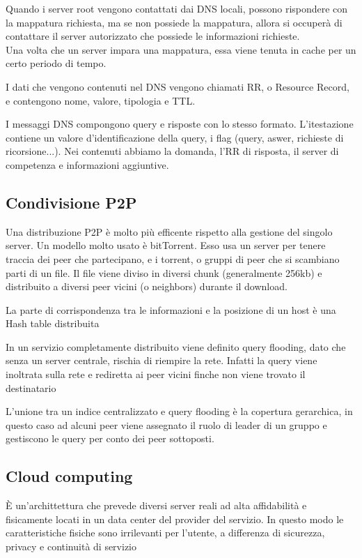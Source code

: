 \documentclass[12pt, a4paper]{article}
\begin{document}
Quando i server root vengono contattati dai DNS locali, possono rispondere con la mappatura richiesta, ma se non possiede
la mappatura, allora si occuperà di contattare il server autorizzato che possiede le informazioni richieste.\\ Una volta 
che un server impara una mappatura, essa viene tenuta in cache per un certo periodo di tempo.

I dati che vengono contenuti nel DNS vengono chiamati RR, o Resource Record, e contengono nome, valore, tipologia e TTL.

I messaggi DNS compongono query e risposte con lo stesso formato. L'itestazione contiene un valore d'identificazione della
query, i flag (query, aswer, richieste di ricorsione...). Nei contenuti abbiamo la domanda, l'RR di risposta, il server di 
competenza e informazioni aggiuntive.

\subsection{Condivisione P2P}
Una distribuzione P2P è molto più efficente rispetto alla gestione del singolo server. Un modello molto usato è bitTorrent.
Esso usa un server per tenere traccia dei peer che partecipano, e i torrent, o gruppi di peer che si scambiano parti di un 
file. Il file viene diviso in diversi chunk (generalmente 256kb) e distribuito a diversi peer vicini (o neighbors) durante
il download.

La parte di corrispondenza tra le informazioni e la posizione di un host è una Hash table distribuita

In un servizio completamente distribuito viene definito query flooding, dato che senza un server centrale, rischia di 
riempire la rete. Infatti la query viene inoltrata sulla rete e rediretta ai peer vicini finche non viene trovato il
destinatario

L'unione tra un indice centralizzato e query flooding è la copertura gerarchica, in questo caso ad alcuni peer viene 
assegnato il ruolo di leader di un gruppo e gestiscono le query per conto dei peer sottoposti.


\subsection{Cloud computing}
È un'archittettura che prevede diversi server reali ad alta affidabilità e fisicamente locati in un data center del
provider del servizio. In questo modo le caratteristiche fisiche sono irrilevanti per l'utente, a differenza di 
sicurezza, privacy e continuità di servizio
\end{document}
